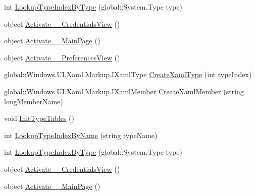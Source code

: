 \begin{DoxyCompactItemize}
\item 
int \hyperlink{class_eli_log_in_app_1_1_eli_log_in_app___xaml_type_info_1_1_xaml_type_info_provider_a453cf311d0a1c227eff7bfcfb266cf2f}{Lookup\+Type\+Index\+By\+Type} (global\+::\+System.\+Type type)
\item 
object \hyperlink{class_eli_log_in_app_1_1_eli_log_in_app___xaml_type_info_1_1_xaml_type_info_provider_a01e6bb3a6b174fc011375cf553a6f095}{Activate\+\_\+\_\+\+Credentials\+View} ()
\item 
object \hyperlink{class_eli_log_in_app_1_1_eli_log_in_app___xaml_type_info_1_1_xaml_type_info_provider_ad5797ff4475aaa7ef01f104191782a0f}{Activate\+\_\+\_\+\+Main\+Page} ()
\item 
object \hyperlink{class_eli_log_in_app_1_1_eli_log_in_app___xaml_type_info_1_1_xaml_type_info_provider_a9d824bf7047ee59b79e8d12eac141273}{Activate\+\_\+\_\+\+Preferences\+View} ()
\item 
global\+::\+Windows.\+U\+I.\+Xaml.\+Markup.\+I\+Xaml\+Type \hyperlink{class_eli_log_in_app_1_1_eli_log_in_app___xaml_type_info_1_1_xaml_type_info_provider_ab81d867444ab14bd51b63aba4089901b}{Create\+Xaml\+Type} (int type\+Index)
\item 
global\+::\+Windows.\+U\+I.\+Xaml.\+Markup.\+I\+Xaml\+Member \hyperlink{class_eli_log_in_app_1_1_eli_log_in_app___xaml_type_info_1_1_xaml_type_info_provider_a8e9162d3ca590994cc68dcf8f94ffad2}{Create\+Xaml\+Member} (string long\+Member\+Name)
\item 
void \hyperlink{class_eli_log_in_app_1_1_eli_log_in_app___xaml_type_info_1_1_xaml_type_info_provider_ae3ee5a8073d4b5fd053001fc6278bf63}{Init\+Type\+Tables} ()
\item 
int \hyperlink{class_eli_log_in_app_1_1_eli_log_in_app___xaml_type_info_1_1_xaml_type_info_provider_a26e953f4fb4614e058021c6ba196921b}{Lookup\+Type\+Index\+By\+Name} (string type\+Name)
\item 
int \hyperlink{class_eli_log_in_app_1_1_eli_log_in_app___xaml_type_info_1_1_xaml_type_info_provider_a453cf311d0a1c227eff7bfcfb266cf2f}{Lookup\+Type\+Index\+By\+Type} (global\+::\+System.\+Type type)
\item 
object \hyperlink{class_eli_log_in_app_1_1_eli_log_in_app___xaml_type_info_1_1_xaml_type_info_provider_a01e6bb3a6b174fc011375cf553a6f095}{Activate\+\_\+\_\+\+Credentials\+View} ()
\item 
object \hyperlink{class_eli_log_in_app_1_1_eli_log_in_app___xaml_type_info_1_1_xaml_type_info_provider_ad5797ff4475aaa7ef01f104191782a0f}{Activate\+\_\+\_\+\+Main\+Page} ()

\end{DoxyCompactItemize}
